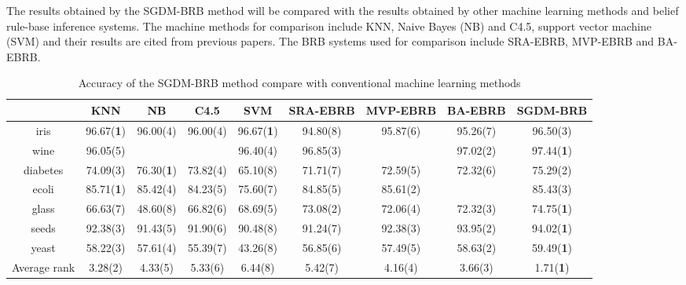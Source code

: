 \documentclass{ieeeaccess}
\begin{document}
The results obtained by the SGDM-BRB method will be compared with the results obtained by
other machine learning methods and belief rule-base inference systems.
The machine methods for comparison include KNN, Naive Bayes (NB) and C4.5, support vector machine (SVM)
and their results are cited from previous papers\cite{a22,a27}.
The BRB systems used for comparison include SRA-EBRB\cite{a20}, MVP-EBRB\cite{a21} and BA-EBRB\cite{a22}.

\begin{table}
    \caption{Accuracy of the SGDM-BRB method compare with conventional machine learning methods}
    \centering
    \label{tab5}
    \begin{tabular}{|c|c|c|c|c|c|c|c|c|}
        \hline
                     & KNN               & NB                & C4.5     & SVM               & SRA-EBRB & MVP-EBRB & BA-EBRB  & SGDM-BRB          \\
        \hline
        iris         & 96.67(\textbf{1}) & 96.00(4)          & 96.00(4) & 96.67(\textbf{1}) & 94.80(8) & 95.87(6) & 95.26(7) & 96.50(3)          \\
        wine         & 96.05(5)          &                   &          & 96.40(4)          & 96.85(3) &          & 97.02(2) & 97.44(\textbf{1}) \\
        diabetes     & 74.09(3)          & 76.30(\textbf{1}) & 73.82(4) & 65.10(8)          & 71.71(7) & 72.59(5) & 72.32(6) & 75.29(2)          \\
        ecoli        & 85.71(\textbf{1}) & 85.42(4)          & 84.23(5) & 75.60(7)          & 84.85(5) & 85.61(2) &          & 85.43(3)          \\
        glass        & 66.63(7)          & 48.60(8)          & 66.82(6) & 68.69(5)          & 73.08(2) & 72.06(4) & 72.32(3) & 74.75(\textbf{1}) \\
        seeds        & 92.38(3)          & 91.43(5)          & 91.90(6) & 90.48(8)          & 91.24(7) & 92.38(3) & 93.95(2) & 94.02(\textbf{1}) \\
        yeast        & 58.22(3)          & 57.61(4)          & 55.39(7) & 43.26(8)          & 56.85(6) & 57.49(5) & 58.63(2) & 59.49(\textbf{1}) \\
        \hline
        Average rank & 3.28(2)           & 4.33(5)           & 5.33(6)  & 6.44(8)           & 5.42(7)  & 4.16(4)  & 3.66(3)  & 1.71(\textbf{1})  \\
        \hline
    \end{tabular}
\end{table}
\end{document}
